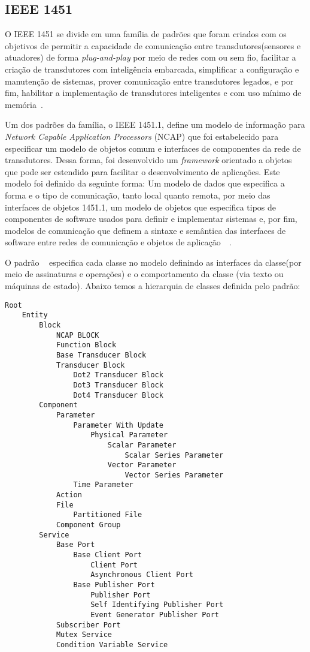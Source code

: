 \subsection{IEEE 1451}
O IEEE 1451 se divide em uma família de padrões que foram criados com os objetivos de permitir a capacidade de comunicação entre transdutores(sensores e atuadores) de forma \emph{plug-and-play} por meio de redes com ou sem fio, facilitar a criação de transdutores com inteligência embarcada, simplificar a configuração e manutenção de sistemas, prover comunicação entre transdutores legados, e por fim, habilitar a implementação de transdutores inteligentes e com uso mínimo de memória~\cite{ieee1451journal}.

Um dos padrões da família, o IEEE 1451.1, define um modelo de informação para \emph{Network Capable Application Processors} (NCAP) que foi estabelecido para especificar um modelo de objetos comum e interfaces de componentes da rede de transdutores. Dessa forma, foi desenvolvido um \emph{framework} orientado a objetos que pode ser estendido para facilitar o desenvolvimento de aplicações. Este modelo foi definido da seguinte forma: Um modelo de dados que especifica a forma e o tipo de comunicação, tanto local quanto remota, por meio das interfaces de objetos 1451.1, um modelo de objetos que especifica tipos de componentes de software usados para definir e implementar sistemas e, por fim, modelos de comunicação que definem a sintaxe e semântica das interfaces de software entre redes de comunicação e objetos de aplicação~\cite{ieeeOO1451}~\cite{ieee1451monitoring}.


O padrão ~\cite{ieee1451standard} especifica cada classe no modelo definindo as interfaces da classe(por meio de assinaturas e operações) e o comportamento da classe (via texto ou máquinas de estado). Abaixo temos a hierarquia de classes definida pelo padrão:

\begin{lstlisting}[frame=single]
Root
	Entity
		Block
			NCAP BLOCK
			Function Block
			Base Transducer Block
			Transducer Block
				Dot2 Transducer Block
				Dot3 Transducer Block
				Dot4 Transducer Block
		Component
			Parameter
				Parameter With Update
					Physical Parameter
						Scalar Parameter
							Scalar Series Parameter
						Vector Parameter
							Vector Series Parameter
				Time Parameter
			Action
			File
				Partitioned File
			Component Group
		Service
			Base Port
				Base Client Port
					Client Port
					Asynchronous Client Port
				Base Publisher Port
					Publisher Port
					Self Identifying Publisher Port
					Event Generator Publisher Port
			Subscriber Port
			Mutex Service
			Condition Variable Service
\end{lstlisting}

